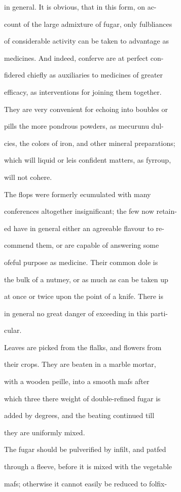 \documentclass{article}
\begin{document}
in general. It is obvious, that in this form, on ac-

count of the large admixture of fugar, only fulbliances

of considerable activity can be taken to advantage as

medicines. And indeed, conferve are at perfect con-

fidered chiefly as auxiliaries to medicines of greater

efficacy, as interventions for joining them together.

They are very convenient for echoing into boubles or

pills the more pondrous powders, as mecurunu dul-

cies, the colors of iron, and other mineral preparations;

which will liquid or leis confident matters, as fyrroup,

will not cohere.

The flops were formerly ecumulated with many

conferences altogether insignificant; the few now retain-

ed have in general either an agreeable flavour to re-

commend them, or are capable of answering some

ofeful purpose as medicine. Their common dole is

the bulk of a nutmey, or as much as can be taken up

at once or twice upon the point of a knife. There is

in general no great danger of exceeding in this parti-

cular.

Leaves are picked from the flalks, and flowers from

their crops. They are beaten in a marble mortar,

with a wooden peille, into a smooth mafs after

which three there weight of double-refined fugar is

added by degrees, and the beating continued till

they are uniformly mixed.

The fugar should be pulverified by infilt, and patfed

through a fleeve, before it is mixed with the vegetable

mafs; otherwise it cannot easily be reduced to folfix-
\end{document}
